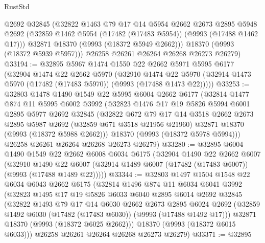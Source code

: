 \begin{lexlean}{RustStd}
\begin{coremodule}
        @2692
        @32845
        (@32822
          @1463
          @79
          @17
          @14
          @5954
          @2662
          @2673
          @2895
          @5948
          @2692
          (@32859 @1462 @5954 (@17482 (@17483 @5954)) (@9993 (@17488 @1462 @17)))
          @32871
          @18370
          (@9993 (@18372 @5949 @2662)))
        @18370
        (@9993 (@18372 @5939 @5957)))
      @26258
      @26261
      @26264
      @26268
      @26273
      @26279)
@33194 := @32895
    @5967
    @1474
    @1550
    @22
    @2662
    @5971
    @5995
    @6177
    (@32904
      @1474
      @22
      @2662
      @5970
      (@32910
        @1474
        @22
        @5970
        (@32914 @1473 @5970 (@17482 (@17483 @5970)) (@9993 (@17488 @1473 @22)))))
@33253 := @32803
    @1478
    @1490
    @1549
    @22
    @5995
    @6004
    @2662
    @6177
    (@32814
      @1477
      @874
      @11
      @5995
      @6002
      @3992
      (@32823
        @1476
        @17
        @19
        @5826
        @5994
        @6001
        @2895
        @5977
        @2692
        @32845
        (@32822
          @672
          @79
          @17
          @14
          @3518
          @2662
          @2673
          @2895
          @5987
          @2692
          (@32859 @671 @3518 @21956 @21960)
          @32871
          @18370
          (@9993 (@18372 @5988 @2662)))
        @18370
        (@9993 (@18372 @5978 @5994)))
      @26258
      @26261
      @26264
      @26268
      @26273
      @26279)
@33280 := @32895
    @6004
    @1490
    @1549
    @22
    @2662
    @6008
    @6034
    @6175
    (@32904
      @1490
      @22
      @2662
      @6007
      (@32910
        @1490
        @22
        @6007
        (@32914 @1489 @6007 (@17482 (@17483 @6007)) (@9993 (@17488 @1489 @22)))))
@33344 := @32803
    @1497
    @1504
    @1548
    @22
    @6034
    @6043
    @2662
    @6175
    (@32814
      @1496
      @874
      @11
      @6034
      @6041
      @3992
      (@32823
        @1495
        @17
        @19
        @5826
        @6033
        @6040
        @2895
        @6014
        @2692
        @32845
        (@32822
          @1493
          @79
          @17
          @14
          @6030
          @2662
          @2673
          @2895
          @6024
          @2692
          (@32859 @1492 @6030 (@17482 (@17483 @6030)) (@9993 (@17488 @1492 @17)))
          @32871
          @18370
          (@9993 (@18372 @6025 @2662)))
        @18370
        (@9993 (@18372 @6015 @6033)))
      @26258
      @26261
      @26264
      @26268
      @26273
      @26279)
@33371 := @32895

\end{coremodule}
\end{lexlean}
